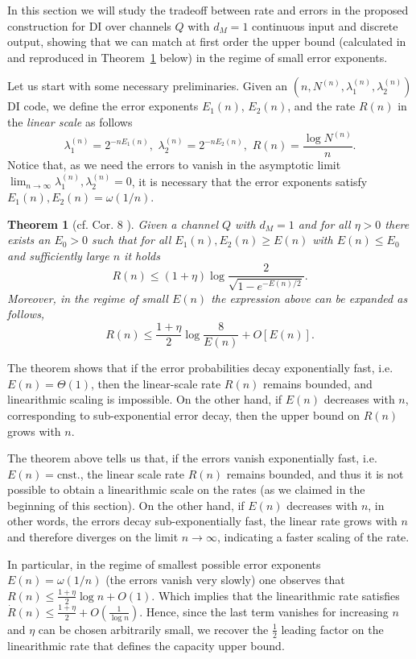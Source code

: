 \documentclass[10pt, conference]{IEEEtran}
\newtheorem{theorem}{Theorem}
\newcommand{\1}{\mathds{1}}
\begin{document}
In this section we will study the tradeoff between rate and errors in the proposed construction for DI over channels $Q$ with $d_M=1$ continuous input and discrete output, showing that we can match at first order the upper bound (calculated in \cite{CDBW:Reliability-TCOM} and reproduced in Theorem~\ref{thm:RR_converse} below) in the regime of small error exponents. 
\medskip

Let us start with some necessary preliminaries. Given an $(n,N^{(n)},\lambda_1^{(n)},\lambda_2^{(n)})$ DI code, we define the error exponents $E_1(n)$, $E_2(n)$, and the rate $R(n)$ in the \emph{linear scale} as follows
\begin{equation}
\lambda_1^{(n)}\!=2^{-nE_1(n)}\!,\,\,\lambda_2^{(n)}\!=2^{-nE_2(n)}\!,\,\,R(n)\!=\!\frac{\log N^{(n)}}{n}.
\end{equation}
Notice that, as we need the errors to vanish in the asymptotic limit $\lim_{n\to\infty}\lambda_1^{(n)},\lambda_2^{(n)}=0$, it is necessary that the error exponents satisfy $E_1(n),E_2(n)=\omega(1/n)$.

\begin{theorem}[cf. Cor. 8 \cite{CDBW:Reliability-TCOM}]\label{thm:RR_converse}
Given a channel $Q$ with $d_M\!=\!1$ and for all $\eta>0$ there exists an $E_0>0$ such that for all $E_1(n),E_2(n)\geq E(n)$ with $E(n)\leq E_0$ and sufficiently large $n$ it holds
\[
R(n)\leq (1+\eta) \log\frac{2}{\sqrt{1-e^{-E(n)/2}}}.
\]
Moreover, in the regime of small $E(n)$ the expression above can be expanded as follows,
\[
R(n)\leq\frac{1+\eta}{2}\log\frac{8}{E(n)}+O[E(n)].
\]
\end{theorem}
The theorem shows that if the error probabilities decay exponentially fast, i.e.\ $E(n)=\Theta(1)$, then the linear-scale rate $R(n)$ remains bounded, and linearithmic scaling is impossible. On the other hand, if $E(n)$ decreases with $n$, corresponding to sub-exponential error decay, then the upper bound on $R(n)$ grows with $n$.

The theorem above tells us that, if the errors vanish exponentially fast, i.e. $E(n)=\text{cnst.}$, the linear scale rate $R(n)$ remains bounded, and thus it is not possible to obtain a linearithmic scale on the rates (as we claimed in the beginning of this section). On the other hand, if $E(n)$ decreases with $n$, in other words, the errors decay sub-exponentially fast, the linear rate grows with $n$ and therefore diverges on the limit $n\to\infty$, indicating a faster scaling of the rate. 

In particular, in the regime of smallest possible error exponents $E(n)=\omega(1/n)$ (the errors vanish very slowly) one observes that $R(n)\leq\frac{1+\eta}{2}\log n+O(1)$. Which implies that the linearithmic rate satisfies $\dot R(n)\leq\frac{1+\eta}{2}+O(\frac{1}{\log n})$. Hence, since the last term vanishes for increasing $n$ and $\eta$ can be chosen arbitrarily small, we recover the $\frac12$ leading factor on the linearithmic rate that defines the capacity upper bound. 
\end{document}
